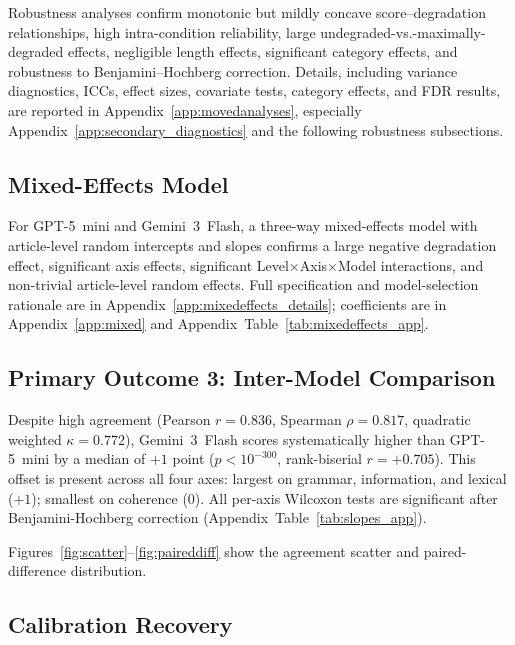 \documentclass[11pt]{article}
\begin{document}
Robustness analyses confirm monotonic but mildly concave score--degradation
relationships, high intra-condition reliability, large undegraded-vs.-maximally-degraded
effects, negligible length effects, significant category effects, and robustness to
Benjamini--Hochberg correction. Details, including variance diagnostics, ICCs,
effect sizes, covariate tests, category effects, and FDR results, are reported in
Appendix~\ref{app:movedanalyses}, especially Appendix~\ref{app:secondary_diagnostics} and the following robustness subsections.

\subsection{Mixed-Effects Model}
\label{sec:mixedeffects}

For GPT-5~mini and Gemini~3~Flash, a three-way mixed-effects model with
article-level random intercepts and slopes confirms a large negative degradation
effect, significant axis effects, significant Level$\times$Axis$\times$Model
interactions, and non-trivial article-level random effects. Full specification and
model-selection rationale are in Appendix~\ref{app:mixedeffects_details}; coefficients are in Appendix~\ref{app:mixed}
and Appendix~Table~\ref{tab:mixedeffects_app}.

\subsection{Primary Outcome 3: Inter-Model Comparison}
\label{sec:intermodel}

Despite high agreement (Pearson $r = 0.836$, Spearman $\rho = 0.817$,
quadratic weighted $\kappa = 0.772$), Gemini~3~Flash scores
systematically higher than GPT-5~mini by a median of $+1$ point ($p <
10^{-300}$, rank-biserial $r = +0.705$). This offset is present
across all four axes: largest on grammar, information, and lexical
($+1$); smallest on coherence ($0$). All per-axis Wilcoxon tests are
significant after Benjamini-Hochberg correction
(Appendix~Table~\ref{tab:slopes_app}).

Figures~\ref{fig:scatter}--\ref{fig:paireddiff} show the agreement
scatter and paired-difference distribution.



\subsection{Calibration Recovery}
\label{sec:calibration}
\end{document}
